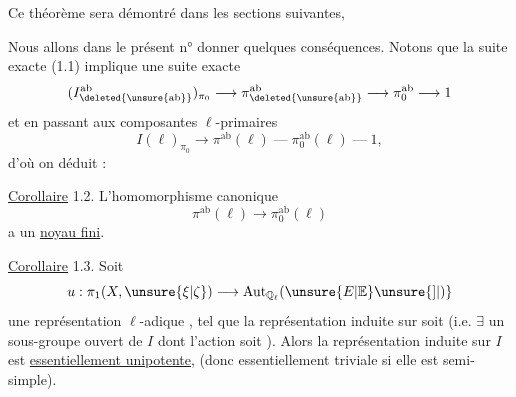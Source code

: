 Ce théorème sera démontré dans les sections suivantes, 

Nous allons dans le présent n° donner quelques conséquences. Notons que la suite exacte (1.1) implique une suite exacte
\[
(I^{\mathrm{ab}}_{\deleted{\unsure{\mathrm{ab}}}})_{\pi_0}\longrightarrow\pi^{\mathrm{ab}}_{\deleted{\unsure{\mathrm{ab}}}}\longrightarrow\pi_0^{\mathrm{ab}}\longrightarrow1
\]
 et en passant aux composantes $\ell$-primaires
\[
I(\ell)_{\pi_0}\longrightarrow\pi^{\mathrm{ab}}(\ell)\mathrel{\text{---}}\pi_0^{\mathrm{ab}}(\ell)\mathrel{\text{---}}1,
\]
d'où on déduit :

\uline{Corollaire} 1.2. L'homomorphisme  canonique
\[
\pi^{\mathrm{ab}}(\ell)\longrightarrow\pi_0^{\mathrm{ab}}(\ell)
\]
 a un \uline{noyau fini}.


\uline{Corollaire} 1.3. Soit
\[
u:\pi_1(X,\unsure{\xi|\zeta})\longrightarrow\operatorname{Aut}_{\mathbb{Q}_\ell}(\unsure{E|\mathbb{E}}\unsure{]|)}
\]
une représentation $\ell$-adique , tel que la représentation induite sur   soit   (i.e. $\exists$ un sous-groupe ouvert de $I$ dont l'action soit  ). Alors la représentation induite sur $I$ est \uline{essentiellement unipotente},  (donc essentiellement triviale si elle est semi-simple).

